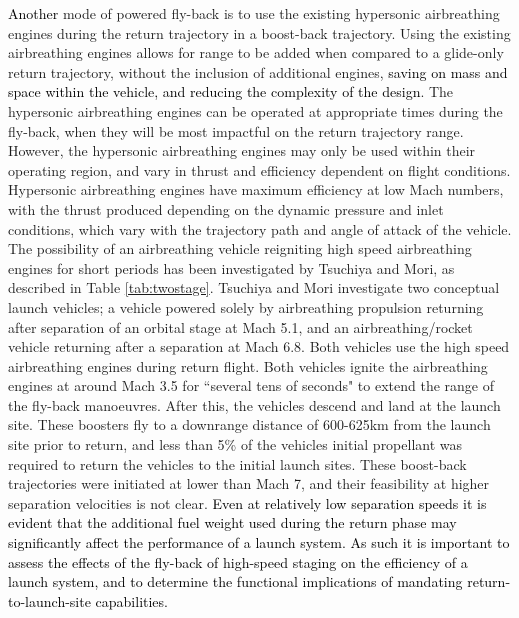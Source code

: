 \textcolor{black}{Another} mode of powered fly-back is to use the existing hypersonic airbreathing engines during the return trajectory in a boost-back trajectory. Using the existing airbreathing engines allows for range to be added when compared to a glide-only return trajectory, without the inclusion of additional engines, \textcolor{black}{saving on mass and space within the vehicle, and reducing the complexity of the design}. The hypersonic airbreathing engines can be operated at appropriate times during the fly-back, when they will be most impactful on the return trajectory range. However, the hypersonic airbreathing engines may only be used within their operating region, and vary in thrust and efficiency dependent on flight conditions. Hypersonic airbreathing engines have maximum efficiency at low Mach numbers\cite{Preller2017b}, with the thrust produced depending on the dynamic pressure and inlet conditions, which vary with the trajectory path and angle of attack of the vehicle. 
The possibility of an airbreathing vehicle reigniting high speed airbreathing engines for short periods has been investigated by Tsuchiya and Mori\cite{Tsuchiya2005}, as described in Table \ref{tab:twostage}.  Tsuchiya and Mori investigate two conceptual launch vehicles; a vehicle powered solely by airbreathing propulsion returning after separation of an orbital stage at Mach 5.1, and an airbreathing/rocket vehicle returning after a separation at Mach 6.8\cite{Tsuchiya2005}.  Both vehicles use the high speed airbreathing engines during return flight. Both vehicles ignite the airbreathing engines at around Mach 3.5 for ``several tens of seconds" to extend the range of the fly-back manoeuvres. After this, the vehicles descend and land at the launch site. 
These boosters fly to a downrange distance of 600-625km from the launch site prior to return, and less than 5\% of the vehicles initial propellant was required to return the vehicles to the initial launch sites\cite{Tsuchiya2005}. These boost-back trajectories were initiated at lower than Mach 7, and their feasibility at higher separation velocities is not clear.
\textcolor{black}{Even at relatively low separation speeds it is evident that the additional fuel weight used during the return phase may significantly affect the performance of a launch system. As such it is important to assess the effects of the fly-back of high-speed staging on the efficiency of a launch system, and to determine the functional implications of mandating return-to-launch-site capabilities. }



